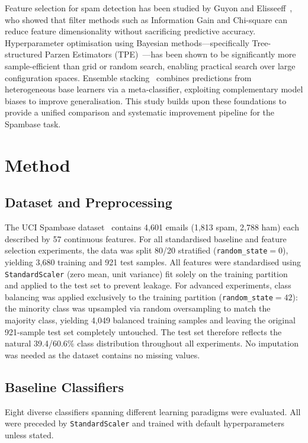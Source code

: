 \documentclass[conference]{IEEEtran}
\begin{document}
Feature selection for spam detection has been studied by Guyon and Elisseeff~\cite{ref9}, who showed that filter methods such as Information Gain and Chi-square can reduce feature dimensionality without sacrificing predictive accuracy. Hyperparameter optimisation using Bayesian methods---specifically Tree-structured Parzen Estimators (TPE)~\cite{ref11}---has been shown to be significantly more sample-efficient than grid or random search, enabling practical search over large configuration spaces. Ensemble stacking~\cite{ref12} combines predictions from heterogeneous base learners via a meta-classifier, exploiting complementary model biases to improve generalisation. This study builds upon these foundations to provide a unified comparison and systematic improvement pipeline for the Spambase task.

\section{Method}

\subsection{Dataset and Preprocessing}

The UCI Spambase dataset~\cite{ref2} contains 4,601 emails (1,813 spam, 2,788 ham) each described by 57 continuous features. For all standardised baseline and feature selection experiments, the data was split 80/20 stratified (\texttt{random\_state}$=0$), yielding 3,680 training and 921 test samples. All features were standardised using \texttt{StandardScaler} (zero mean, unit variance) fit solely on the training partition and applied to the test set to prevent leakage. For advanced experiments, class balancing was applied exclusively to the training partition (\texttt{random\_state}$=42$): the minority class was upsampled via random oversampling to match the majority class, yielding 4,049 balanced training samples and leaving the original 921-sample test set completely untouched. The test set therefore reflects the natural 39.4/60.6\% class distribution throughout all experiments. No imputation was needed as the dataset contains no missing values.

\subsection{Baseline Classifiers}

Eight diverse classifiers spanning different learning paradigms were evaluated. All were preceded by \texttt{StandardScaler} and trained with default hyperparameters unless stated.
\end{document}
